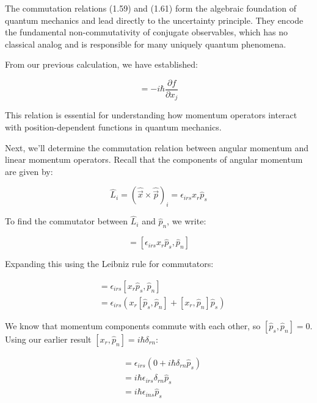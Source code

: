 \documentclass[italian]{HKNdocument}
\begin{document}
The commutation relations (1.59) and (1.61) form the algebraic foundation of quantum mechanics and lead directly to the uncertainty principle. They encode the fundamental non-commutativity of conjugate observables, which has no classical analog and is responsible for many uniquely quantum phenomena.


From our previous calculation, we have established:

\begin{equation*}
[\hat{p}_j, f] = -i\hbar\frac{\partial f}{\partial x_j} \tag{1.62}
\end{equation*}

This relation is essential for understanding how momentum operators interact with position-dependent functions in quantum mechanics.

Next, we'll determine the commutation relation between angular momentum and linear momentum operators. Recall that the components of angular momentum are given by:

\begin{equation*}
\hat{L}_i = (\hat{\vec{x}} \times \hat{\vec{p}})_i = \epsilon_{irs}x_r\hat{p}_s \tag{1.63}
\end{equation*}

To find the commutator between $\hat{L}_i$ and $\hat{p}_n$, we write:

\begin{equation*}
[\hat{L}_i, \hat{p}_n] = [\epsilon_{irs}x_r\hat{p}_s, \hat{p}_n] \tag{1.64}
\end{equation*}

Expanding this using the Leibniz rule for commutators:

\begin{align*}
[\hat{L}_i, \hat{p}_n] &= \epsilon_{irs}[x_r\hat{p}_s, \hat{p}_n] \\
&= \epsilon_{irs}(x_r[\hat{p}_s, \hat{p}_n] + [x_r, \hat{p}_n]\hat{p}_s) \tag{1.65}
\end{align*}

We know that momentum components commute with each other, so $[\hat{p}_s, \hat{p}_n] = 0$. Using our earlier result $[x_r, \hat{p}_n] = i\hbar\delta_{rn}$:

\begin{align*}
[\hat{L}_i, \hat{p}_n] &= \epsilon_{irs}(0 + i\hbar\delta_{rn}\hat{p}_s) \\
&= i\hbar\epsilon_{irs}\delta_{rn}\hat{p}_s \\
&= i\hbar\epsilon_{ins}\hat{p}_s
\end{align*}
\end{document}
